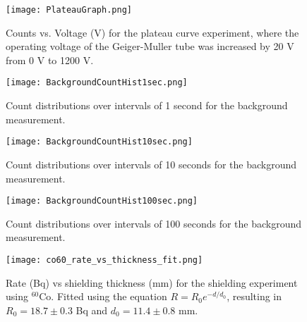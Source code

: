 \begin{figure}[H]
	\centering
	\texttt{[image: PlateauGraph.png]}
	\label{fig:Plateau}
	\caption{Counts vs. Voltage (V) for the plateau curve experiment, where the operating voltage of the Geiger-Muller tube was increased by 20 V from 0 V to 1200 V.}
\end{figure}

\begin{figure}[H]
	\centering
	\texttt{[image: BackgroundCountHist1sec.png]}
	\caption{Count distributions over intervals of 1 second for the background measurement.}
\end{figure}

\begin{figure}[H]
	\centering
	\texttt{[image: BackgroundCountHist10sec.png]}
	\caption{Count distributions over intervals of 10 seconds for the background measurement.}
\end{figure}

\begin{figure}[H]
	\centering
	\texttt{[image: BackgroundCountHist100sec.png]}
	\caption{Count distributions over intervals of 100 seconds for the background measurement.}
\end{figure}

\begin{table}[H]
    \centering
     \label{tab:at} 
    
\end{table}

\begin{figure}[H]
	\centering
	\texttt{[image: co60\_rate\_vs\_thickness\_fit.png]}
	\caption{Rate (Bq) vs shielding thickness (mm) for the shielding experiment using $^{60}$Co. Fitted using the equation $R = R_0 e^{-d/d_0}$, resulting in $R_0 = 18.7 \pm 0.3$ Bq and $d_0 = 11.4 \pm 0.8$ mm.}
\end{figure}

\pagebreak



